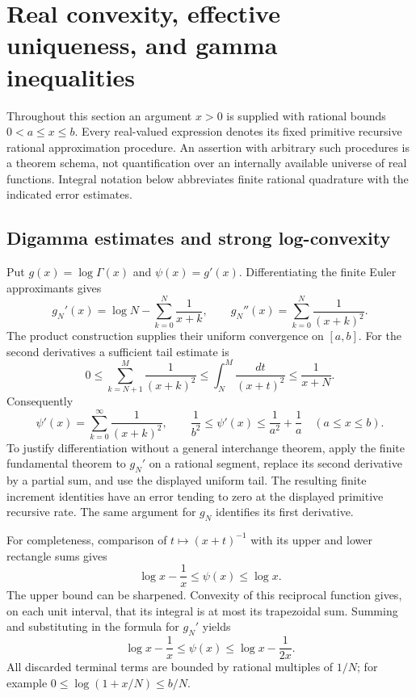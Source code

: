 \section{Real convexity, effective uniqueness, and gamma inequalities}
\label{sec:real-convexity}

Throughout this section an argument $x>0$ is supplied with rational bounds
$0<a\le x\le b$.  Every real-valued expression denotes its fixed primitive
recursive rational approximation procedure.  An assertion with arbitrary
such procedures is a theorem schema, not quantification over an internally
available universe of real functions.  Integral notation below abbreviates
finite rational quadrature with the indicated error estimates.

\subsection{Digamma estimates and strong log-convexity}

Put $g(x)=\log\Gamma(x)$ and $\psi(x)=g'(x)$.  Differentiating the finite
Euler approximants gives
\[
 g_N'(x)=\log N-\sum_{k=0}^{N}\frac1{x+k},\qquad
 g_N''(x)=\sum_{k=0}^{N}\frac1{(x+k)^2}.
\]
The product construction supplies their uniform convergence on $[a,b]$.
For the second derivatives a sufficient tail estimate is
\[
 0\le\sum_{k=N+1}^{M}\frac1{(x+k)^2}
 \le\int_N^M\frac{dt}{(x+t)^2}\le\frac1{x+N}.
\]
Consequently
\begin{equation}\label{eq:psi-prime-positive}
 \psi'(x)=\sum_{k=0}^{\infty}\frac1{(x+k)^2},\qquad
 \frac1{b^2}\le\psi'(x)\le\frac1{a^2}+\frac1a
 \quad(a\le x\le b).
\end{equation}
To justify differentiation without a general interchange theorem, apply
the finite fundamental theorem to $g_N'$ on a rational segment, replace its
second derivative by a partial sum, and use the displayed uniform tail.
The resulting finite increment identities have an error tending to zero
at the displayed primitive recursive rate.  The same argument for $g_N$
identifies its first derivative.

For completeness, comparison of $t\mapsto(x+t)^{-1}$ with its upper and
lower rectangle sums gives
\[
 \log x-\frac1x\le\psi(x)\le\log x.
\]
The upper bound can be sharpened.  Convexity of this reciprocal function
gives, on each unit interval, that its integral is at most its trapezoidal
sum.  Summing and substituting in the formula for $g_N'$ yields
\begin{equation}\label{eq:digamma-elementary-bounds}
 \log x-\frac1x\le\psi(x)\le\log x-\frac1{2x}.
\end{equation}
All discarded terminal terms are bounded by rational multiples of $1/N$;
for example $0\le\log(1+x/N)\le b/N$.

